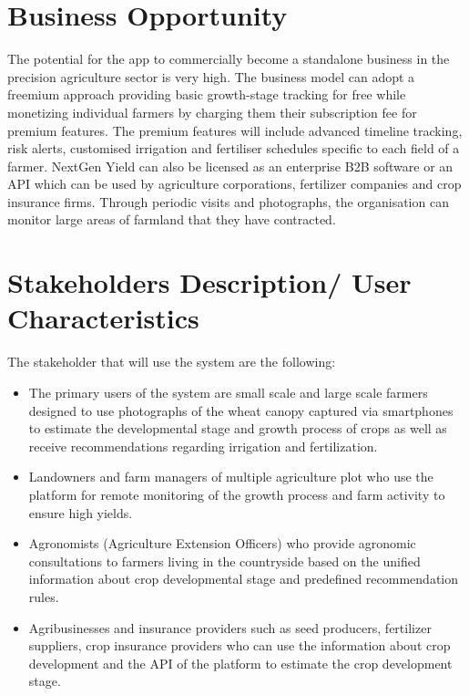 \documentclass{FastFyp}
\begin{document}
\section{Business Opportunity}
The potential for the app to commercially become a standalone business in the precision agriculture sector is very high. The business model can adopt a freemium approach providing basic growth-stage tracking for free while monetizing individual farmers by charging them their subscription fee for premium features. The premium features will include advanced timeline tracking, risk alerts, customised irrigation and fertiliser schedules specific to each field of a farmer.
NextGen Yield can also be licensed as an enterprise B2B software or an API which can be used by agriculture corporations, fertilizer companies and crop insurance firms. Through periodic visits and photographs, the organisation can monitor large areas of farmland that they have contracted. 

 
\section{Stakeholders Description/ User Characteristics}
The stakeholder that will use the system are the following:

\begin{itemize}
    \item The primary users of the system are small scale and large scale farmers designed to use photographs of the wheat canopy captured via smartphones to estimate the developmental stage and growth process of crops as well as receive recommendations regarding irrigation and fertilization.
    \item  Landowners and farm managers of multiple agriculture plot who use the platform for remote monitoring of the growth process and farm activity to ensure high yields.
    \item Agronomists (Agriculture Extension Officers) who provide agronomic consultations to farmers living in the countryside based on the unified information about crop developmental stage and predefined recommendation rules.
    \item Agribusinesses and insurance providers such as seed producers, fertilizer suppliers, crop insurance providers who can use the information about crop development and the API of the platform to estimate the crop development stage.
\end{itemize}

 
\end{document}
